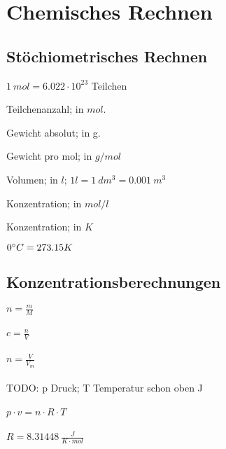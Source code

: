 \section{Chemisches Rechnen}

\subsection{Stöchiometrisches Rechnen}

\begin{definition}[mol]
	$1 \ mol = 6.022 \cdot 10^{23}$ Teilchen
\end{definition}

\begin{definition}[n]
	Teilchenanzahl; in $mol$.
\end{definition}

\begin{definition}[m]
	Gewicht absolut; in g.
\end{definition}

\begin{definition}[M]
	Gewicht pro mol; in $g/mol$
\end{definition}

\begin{definition}[V]

	Volumen; in	$l$; $1l=1\ dm^3=0.001\ m^3$
\end{definition}

\begin{definition}[c]
	Konzentration; in $mol/l$
\end{definition}

\begin{definition}[T]
	Konzentration; in $K$
	
	$0\degree C = 273.15K$
\end{definition}

\subsection{Konzentrationsberechnungen}

\large{
	$n=\frac{m}{M}$
	\\ \\
	$c=\frac{n}{V}$
	\\ \\
	$n = \frac{V}{V_m}$
	\\ \\
	TODO: p Druck; T Temperatur schon oben ^^
	\\ \\
	$ p \cdot v = n \cdot R \cdot T $
	\\ \\
	$R = 8.31448 \ \frac{J}{K \cdot mol}$
}